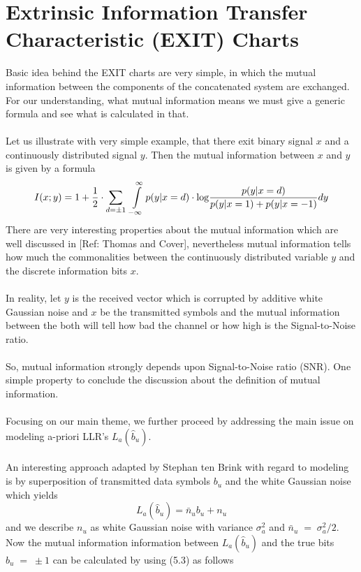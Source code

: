 \section{Extrinsic Information Transfer Characteristic (EXIT) Charts}
Basic idea behind the EXIT charts are very simple, in which the mutual information between the components of the concatenated system are exchanged. For our understanding, what mutual information means we must give a generic formula and see what is calculated in that.\\  \\
Let us illustrate with very simple example, that there exit binary signal $x$ and a continuously distributed signal $y$. Then the mutual information between $x$ and $y$ is given by a formula
\begin{equation}
I(x;y)=1+\frac{\hbox{$1$}}{\hbox{$2$}}\cdot \sum\limits_{d=\pm 1}\;\int\limits_{-\infty}^{\infty}p(y\vert x = d)\cdot \mathrm{log}\frac{\hbox{$p(y\vert x = d)$}}{\hbox{$p(y\vert x= 1)+p(y\vert x =-1)$}}dy
\end{equation}
There are very interesting properties about the mutual information which are well discussed in [Ref: Thomas and Cover], nevertheless mutual information tells how much the commonalities between the continuously distributed variable $y$ and the discrete information bits $x$. \\ \\ In reality, let $y$ is the received vector which is corrupted by additive white Gaussian noise and $x$ be the transmitted symbols and the mutual information between the both will tell how bad the channel or how high is the Signal-to-Noise ratio. \\ \\
So, mutual information strongly depends upon Signal-to-Noise ratio (SNR). One simple property to conclude the discussion about the definition of mutual information. \\ \\
Focusing on our main theme, we further proceed by addressing the main issue on modeling a-priori LLR's $L_a(\hat{b}_u)$.\\ \\
An interesting approach adapted by Stephan ten Brink with regard to modeling is by superposition of transmitted data symbols $b_u$ and the white Gaussian noise which yields
\begin{equation}
L_a(\hat{b}_u)=\bar{n}_u b_u + n_u
\end{equation}
and we describe $n_u$ as white Gaussian noise with variance $\sigma_a^2$ and $\bar{n}_u\;=\;\sigma_a^2/2$. Now the mutual information information between $L_a(\hat{b}_u)$ and the true bits $b_u\;=\;\pm 1$ can be calculated by using (5.3) as follows
